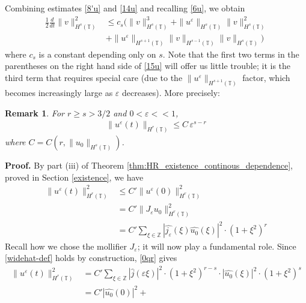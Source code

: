 \documentclass[12pt,reqno]{amsart}
\newcommand{\zz}{\mathbb{Z}}
\newcommand{\ci}{\mathbb{T}}
\newcommand{\ee}{\varepsilon}
\theoremstyle{plain}  %
\newtheorem{remark}{Remark}
\theoremstyle{definition}
\begin{document}
\begin{appendices}
\begin{equation}
	\end{equation}
	Combining estimates \eqref{8'u} and \eqref{14u} and recalling
	\eqref{6u}, we obtain
	\begin{equation}
		\begin{split}
			\frac{1}{2}\frac{d}{dt}\|v\|_{H^{s}(\ci)}^2
			& \le c_s(\|v\|_{H^s(\ci)}^3 + \|u^\ee\|_{H^s(\ci)}
			\|v\|_{H^s(\ci)}^2
			\\
			& + \|u^\ee\|_{H^{s+1}(\ci)}
			\|v\|_{H^{s-1}(\ci)} \|v\|_{H^s(\ci)})
			\label{15u}
		\end{split}
	\end{equation}
	where $c_s$ is a constant depending only on $s$.
	Note that the first two terms in the parentheses on the right hand side
	of \eqref{15u} will offer us little trouble;
	it is the third term that requires special care (due to the
	$\|u^\ee\|_{H^{s+1}(\ci)}$ factor, which becomes increasingly large as
	$\ee$ decreases). More precisely:
	\begin{remark}
	\label{lem5r}
	For $r \ge s > 3/2$ and $0 < \ee <<1$, 
	\begin{equation}
		\begin{split}
			\|u^{\ee} (t) \|_{H^r(\ci)} \le C \, \ee^{s-r}
			\label{700r}
		\end{split}
	\end{equation}
	where $C = C(r, \|u_0\|_{H^s(\ci)})$.
\end{remark}	
{\bf Proof.} By part (iii) of Theorem
\ref{thm:HR_existence_continous_dependence}, proved in Section
\ref{existence}, we have
\begin{equation}
	\begin{split}
		\|u^\ee(t) \|_{H^r(\ci)}^2
		& \le C' \|u^\ee (0)\|_{H^r(\ci)}^2
		\\
		& = C' \|J_\ee u_0\|_{H^r(\ci)}^2
		\\
		& = C' \sum_{\xi \in \zz} |\widehat{j_\ee} (\xi) \widehat{u_0}(\xi)
		|^2 \cdot (1 + \xi^2)^r
		\label{0qr}
	\end{split}
\end{equation}
Recall how we chose the mollifier $J_\ee$; it will now play a fundamental role. Since
\eqref{widehat-def} holds by construction, \eqref{0qr} gives 
\begin{equation}
	\begin{split}
		\|u^\ee(t) \|_{H^r(\ci)}^2
		& = C' \sum_{\xi \in \zz} |\widehat{j }(\ee \xi)|^2 \cdot (1 +
		\xi^2)^{r-s} \cdot |\widehat{u_0}(\xi)|^2 \cdot (1 + \xi^2)^s
		\\
		& = C'|\widehat{u_0}(0)|^2 +

\end{split}
\end{equation}
\end{appendices}
\end{document}
